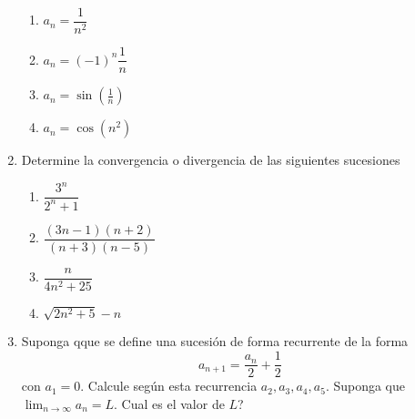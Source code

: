 \documentclass[a4paper,11pt]{article}
\theoremstyle{mytheor}
\begin{document}
\begin{enumerate}
\begin{enumerate}
    \item \( a_n = \dfrac{1}{n^2} \)
    \item \( a_n = (-1)^n\dfrac{1}{n} \)
    \item $a_n=\sin\left(\frac{1}{n}\right)$
    \item $a_n=\cos(n^2)$
\end{enumerate}

\item 
Determine la convergencia o divergencia de las siguientes sucesiones
\begin{enumerate}
    \item $\dfrac{3^n}{2^n+1}$
    \item $\dfrac{(3n-1)(n+2)}{(n+3)(n-5)}$
    \item $\dfrac{n}{4n^2+25}$
    \item $\sqrt{2n^2+5}-n$
\end{enumerate}

\item       
Suponga qque se define una sucesión de forma recurrente de la forma
$$a_{n+1}=\dfrac{a_n}{2}+\dfrac{1}{2}$$
 con $a_1=0$. Calcule según esta recurrencia $a_2,a_3,a_4,a_5$. Suponga que $\lim_{n \to \infty} a_n=L$. Cual
 es el valor de $L$?
\end{enumerate}
\end{document}
